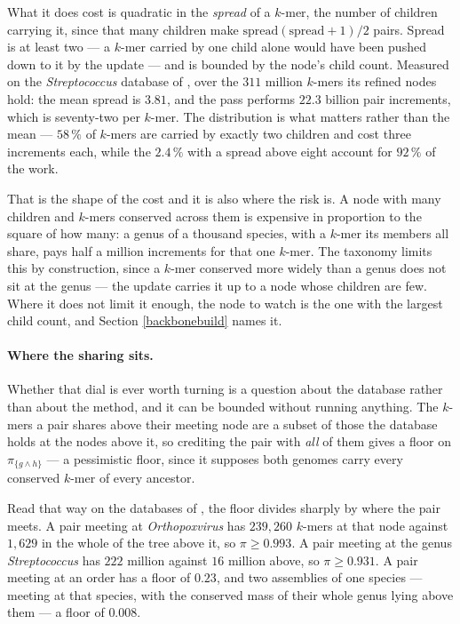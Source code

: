 \documentclass[pdflatex,sn-vancouver-num]{sn-jnl}
\begin{document}
What it does cost is quadratic in the \emph{spread} of a $k$-mer, the number of children carrying it,
since that many children make $\mathrm{spread}(\mathrm{spread}+1)/2$ pairs. Spread is at least two ---
a $k$-mer carried by one child alone would have been pushed down to it by the update --- and is
bounded by the node's child count. Measured on the \emph{Streptococcus} database of
\cite{genestrip-ft}, over the $311$ million $k$-mers its refined nodes hold: the mean spread is
$3.81$, and the pass performs $22.3$ billion pair increments, which is seventy-two per $k$-mer. The
distribution is what matters rather than the mean --- $58\,\%$ of $k$-mers are carried by exactly two
children and cost three increments each, while the $2.4\,\%$ with a spread above eight account for
$92\,\%$ of the work.

That is the shape of the cost and it is also where the risk is. A node with many children and $k$-mers
conserved across them is expensive in proportion to the square of how many: a genus of a thousand
species, with a $k$-mer its members all share, pays half a million increments for that one $k$-mer.
The taxonomy limits this by construction, since a $k$-mer conserved more widely than a genus does not
sit at the genus --- the update carries it up to a node whose children are few. Where it does not
limit it enough, the node to watch is the one with the largest child count, and Section
\ref{backbonebuild} names it.

\paragraph{Where the sharing sits.} Whether that dial is ever worth turning is a question about the
database rather than about the method, and it can be bounded without running anything. The $k$-mers a
pair shares above their meeting node are a subset of those the database holds at the nodes above it,
so crediting the pair with \emph{all} of them gives a floor on $\pi_{\{g \wedge h\}}$ --- a
pessimistic floor, since it supposes both genomes carry every conserved $k$-mer of every ancestor.

Read that way on the databases of \cite{genestrip-ft}, the floor divides sharply by where the pair
meets. A pair meeting at \emph{Orthopoxvirus} has $239{,}260$ $k$-mers at that node against $1{,}629$
in the whole of the tree above it, so $\pi \geq 0.993$. A pair meeting at the genus
\emph{Streptococcus} has $222$ million against $16$ million above, so $\pi \geq 0.931$. A pair meeting
at an order has a floor of $0.23$, and two assemblies of one species --- meeting at that species, with
the conserved mass of their whole genus lying above them --- a floor of $0.008$.
\end{document}
